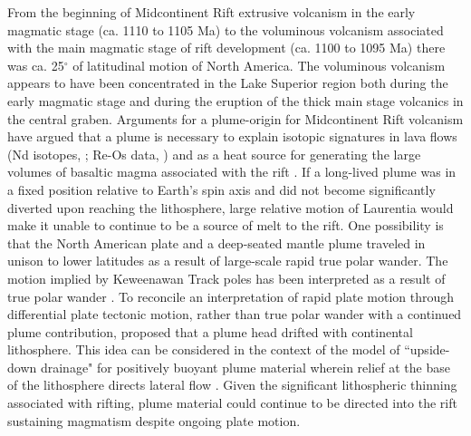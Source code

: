 \documentclass[draft,gc]{AGUTeX}
\begin{document}
\begin{article}
From the beginning of Midcontinent Rift extrusive volcanism in the early magmatic stage (ca. 1110 to 1105 Ma) to the voluminous volcanism associated with the main magmatic stage of rift development (ca. 1100 to 1095 Ma) there was ca. 25$^\circ$ of latitudinal motion of North America. The voluminous volcanism appears to have been concentrated in the Lake Superior region both during the early magmatic stage and during the eruption of the thick main stage volcanics in the central graben. Arguments for a plume-origin for Midcontinent Rift volcanism have argued that a plume is necessary to explain isotopic signatures in lava flows (Nd isotopes, \citet{Nicholson1997a}; Re-Os data, \citet{Shirey1997a}) and as a heat source for generating the large volumes of basaltic magma associated with the rift \citep{Cannon1992b}. If a long-lived plume was in a fixed position relative to Earth's spin axis and did not become significantly diverted upon reaching the lithosphere, large relative motion of Laurentia would make it unable to continue to be a source of melt to the rift. One possibility is that the North American plate and a deep-seated mantle plume traveled in unison to lower latitudes as a result of large-scale rapid true polar wander. The motion implied by Keweenawan Track poles has been interpreted as a result of true polar wander \citep{Evans2003b, Mitchell2012a}. To reconcile an interpretation of rapid plate motion through differential plate tectonic motion, rather than true polar wander with a continued plume contribution, \citet{Davis1997a} proposed that a plume head drifted with continental lithosphere. This idea can be considered in the context of the model of ``upside-down drainage" for positively buoyant plume material wherein relief at the base of the lithosphere directs lateral flow \citep{Sleep1997a, Ebinger1998a}. Given the significant lithospheric thinning associated with rifting, plume material could continue to be directed into the rift sustaining magmatism despite ongoing plate motion.


\end{article}
\end{document}

